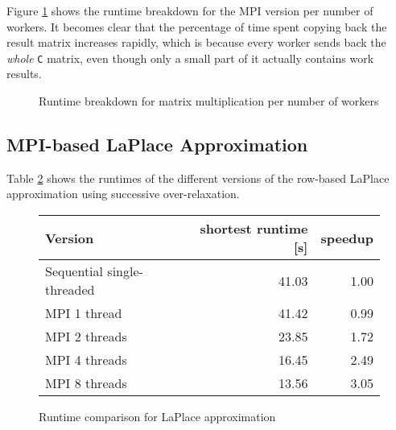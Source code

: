 \documentclass[]{article}
\begin{document}
Figure \ref{fig:maxtrix-mult-chart} shows the runtime breakdown for the MPI version per number of workers. It becomes clear that the percentage of time spent copying back the result matrix increases rapidly, which is because every worker sends back the \emph{whole} \texttt{C} matrix, even though only a small part of it actually contains work results.

\begin{figure}[h]
	\centering
	\caption{Runtime breakdown for matrix multiplication per number of workers}
	\label{fig:maxtrix-mult-chart}
\end{figure}

\subsection{MPI-based LaPlace Approximation}

 Table \ref{tab:laplace-sor-runtime} shows the runtimes of the different versions of the row-based LaPlace approximation using successive over-relaxation.

\begin{figure}[h]
	\centering
	\begin{tabular}{|l|r|r|}
		\hline
		\textbf{Version} & \textbf{shortest runtime [s]} & \textbf{speedup} \\
		\hline
		Sequential single-threaded	& 41.03 & 1.00 \\ 
		\hline 
		MPI 1 thread				& 41.42 & 0.99 \\ 
		\hline 
		MPI 2 threads				& 23.85 & 1.72 \\ 
		\hline 
		MPI 4 threads 				& 16.45 & 2.49 \\ 
		\hline 
		MPI 8 threads				& 13.56 & 3.05 \\ 
		\hline 
	\end{tabular} 
	\caption{Runtime comparison for LaPlace approximation}
	\label{tab:laplace-sor-runtime}
\end{figure}
\end{document}
